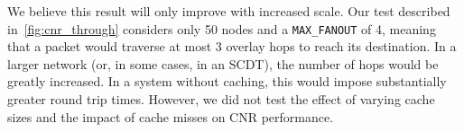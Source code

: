 We believe this result will only improve with increased scale. Our test described  in~\autoref{fig:cnr_through} considers only 50 nodes and a \texttt{MAX\_FANOUT} of 4, meaning that a packet would traverse at most 3 overlay hops to reach its destination. In a larger network (or, in some cases, in an SCDT), the number of hops would be greatly increased. In a system without caching, this would impose substantially greater round trip times. However, we did not test the effect of varying cache sizes and the impact of cache misses on CNR performance.
